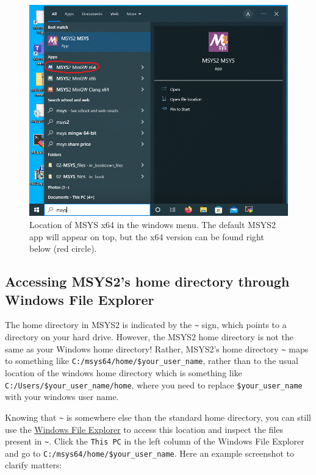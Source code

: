\documentclass[
]{book}
\begin{document}
\begin{figure}
\includegraphics[width=11.62in]{images/screenshot_windows_msys64_menu} \caption{Location of MSYS x64 in the windows menu. The default MSYS2 app will appear on top, but the x64 version can be found right below (red circle).}\label{fig:figScreenShotMenu}
\end{figure}

\hypertarget{section:MSYS2homedir}{%
\subsection{Accessing MSYS2's home directory through Windows File Explorer}\label{section:MSYS2homedir}}

The home directory in MSYS2 is indicated by the \texttt{\textasciitilde{}} sign, which points to a directory on your hard drive. However, the MSYS2 home directory is not the same as your Windows home directory! Rather, MSYS2's home directory \texttt{\textasciitilde{}} maps to something like \texttt{C:/msys64/home/\$your\_user\_name}, rather than to the usual location of the windows home directory which is something like \texttt{C:/Users/\$your\_user\_name/home}, where you need to replace \texttt{\$your\_user\_name} with your windows user name.

Knowing that \texttt{\textasciitilde{}} is somewhere else than the standard home directory, you can still use the \href{https://support.microsoft.com/en-us/windows/find-and-open-file-explorer-ef370130-1cca-9dc5-e0df-2f7416fe1cb1\#WindowsVersion=Windows_10}{Windows File Explorer} to access this location and inspect the files present in \texttt{\textasciitilde{}}. Click the \texttt{This\ PC} in the left column of the Windows File Explorer and go to \texttt{C:/msys64/home/\$your\_user\_name}. Here an example screenshot to clarify matters:
\end{document}
